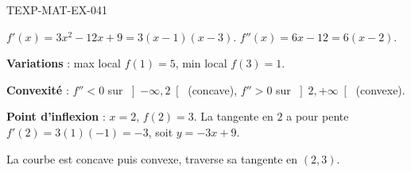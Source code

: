 \begin{corrige}{TEXP-MAT-EX-041}

$f'(x) = 3x^2 - 12x + 9 = 3(x-1)(x-3)$. $f''(x) = 6x - 12 = 6(x-2)$.


\textbf{Variations} : max local $f(1)=5$, min local $f(3)=1$.

\textbf{Convexité} : $f''<0$ sur $\left]-\infty,2\right[$ (concave), $f''>0$ sur $\left]2,+\infty\right[$ (convexe).

\textbf{Point d'inflexion} : $x=2$, $f(2)=3$. La tangente en $2$ a pour pente $f'(2) = 3(1)(-1) = -3$, soit $y = -3x+9$.

La courbe est concave puis convexe, traverse sa tangente en $(2,3)$.

\end{corrige}
